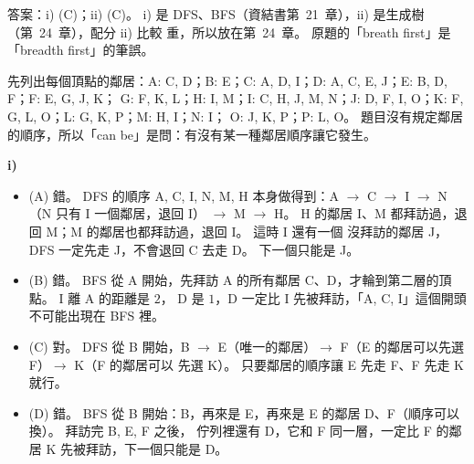 \begin{pastsoln}
答案：i) (C)；ii) (C)。 i) 是 DFS、BFS（資結書第~21~章），ii) 是生成樹（第~24~章），配分 ii) 比較
重，所以放在第~24~章。 原題的「breath first」是「breadth first」的筆誤。

先列出每個頂點的鄰居：A: C, D；B: E；C: A, D, I；D: A, C, E, J；E: B, D, F；F: E, G, J, K；
G: F, K, L；H: I, M；I: C, H, J, M, N；J: D, F, I, O；K: F, G, L, O；L: G, K, P；M: H, I；N: I；
O: J, K, P；P: L, O。 題目沒有規定鄰居的順序，所以「can be」是問：有沒有某一種鄰居順序讓它發生。

\textbf{i)}
\begin{itemize}
\item (A) 錯。 DFS 的順序 A, C, I, N, M, H 本身做得到：A $\to$ C $\to$ I $\to$ N（N 只有 I 一個鄰居，退回 I）
$\to$ M $\to$ H。 H 的鄰居 I、M 都拜訪過，退回 M；M 的鄰居也都拜訪過，退回 I。 這時 I 還有一個
沒拜訪的鄰居 J，DFS 一定先走 J，不會退回 C 去走 D。 下一個只能是 J。
\item (B) 錯。 BFS 從 A 開始，先拜訪 A 的所有鄰居 C、D，才輪到第二層的頂點。 I 離 A 的距離是 $2$，
D 是 $1$，D 一定比 I 先被拜訪，「A, C, I」這個開頭不可能出現在 BFS 裡。
\item (C) 對。 DFS 從 B 開始，B $\to$ E（唯一的鄰居）$\to$ F（E 的鄰居可以先選 F）$\to$ K（F 的鄰居可以
先選 K）。 只要鄰居的順序讓 E 先走 F、F 先走 K 就行。
\item (D) 錯。 BFS 從 B 開始：B，再來是 E，再來是 E 的鄰居 D、F（順序可以換）。 拜訪完 B, E, F 之後，
佇列裡還有 D，它和 F 同一層，一定比 F 的鄰居 K 先被拜訪，下一個只能是 D。
\end{itemize}


\end{pastsoln}
